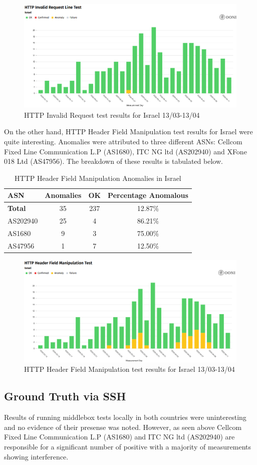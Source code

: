 \begin{figure} [H]
    \centering
    \includegraphics[width=0.5\linewidth]{ISROONIDBMB1.png}
    \caption{HTTP Invalid Request test results for Israel 13/03-13/04}
    \label{fig:enter-label}
\end{figure}

On the other hand, HTTP Header Field Manipulation test results for Israel were quite interesting. Anomalies were attributed to three different ASNs: Cellcom Fixed Line Communication L.P (AS1680), ITC NG ltd (AS202940) and XFone 018 Ltd (AS47956). The breakdown of these results is tabulated below.

\begin{table}[H]
\centering
\caption{HTTP Header Field Manipulation Anomalies in Israel}
\begin{tabular}{lccc}
\toprule
\textbf{ASN} & \textbf{Anomalies} & \textbf{OK} & \textbf{Percentage Anomalous} \\
\midrule
\textbf{Total}       & 35 & 237 & 12.87\% \\
\midrule
AS202940             & 25 & 4   & 86.21\% \\
AS1680               & 9  & 3   & 75.00\% \\
AS47956              & 1  & 7   & 12.50\% \\
\bottomrule
\end{tabular}
\label{tab:http_header_israel}
\end{table}


\begin{figure} [H]
    \centering
    \includegraphics[width=0.5\linewidth]{ISROONIDBMB2.png}
    \caption{HTTP Header Field Manipulation test results for Israel 13/03-13/04}
    \label{fig:enter-label}
\end{figure}

\subsection{Ground Truth via SSH}
Results of running middlebox tests locally in both countries were uninteresting and no evidence of their presense was noted. However, as seen above Cellcom Fixed Line Communication L.P (AS1680) and ITC NG ltd (AS202940) are responsible for a significant number of positive with a majority of measurements showing interference. 




